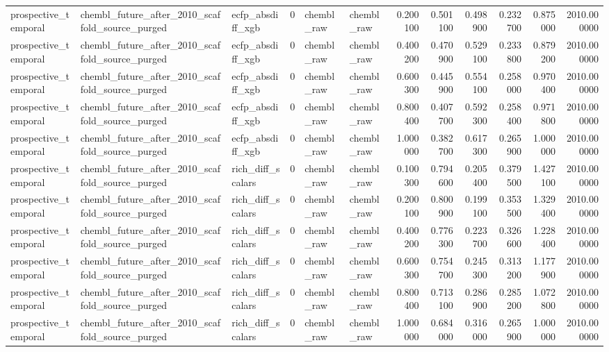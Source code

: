 \begin{longtable}{lllrllrrrrrr}
prospective\_temporal & chembl\_future\_after\_2010\_scaffold\_source\_purged & ecfp\_absdiff\_xgb & 0 & chembl\_raw & chembl\_raw & 0.200100 & 0.501100 & 0.498900 & 0.232700 & 0.875000 & 2010.000000 \\
prospective\_temporal & chembl\_future\_after\_2010\_scaffold\_source\_purged & ecfp\_absdiff\_xgb & 0 & chembl\_raw & chembl\_raw & 0.400200 & 0.470900 & 0.529100 & 0.233800 & 0.879200 & 2010.000000 \\
prospective\_temporal & chembl\_future\_after\_2010\_scaffold\_source\_purged & ecfp\_absdiff\_xgb & 0 & chembl\_raw & chembl\_raw & 0.600300 & 0.445900 & 0.554100 & 0.258000 & 0.970400 & 2010.000000 \\
prospective\_temporal & chembl\_future\_after\_2010\_scaffold\_source\_purged & ecfp\_absdiff\_xgb & 0 & chembl\_raw & chembl\_raw & 0.800400 & 0.407700 & 0.592300 & 0.258400 & 0.971800 & 2010.000000 \\
prospective\_temporal & chembl\_future\_after\_2010\_scaffold\_source\_purged & ecfp\_absdiff\_xgb & 0 & chembl\_raw & chembl\_raw & 1.000000 & 0.382700 & 0.617300 & 0.265900 & 1.000000 & 2010.000000 \\
prospective\_temporal & chembl\_future\_after\_2010\_scaffold\_source\_purged & rich\_diff\_scalars & 0 & chembl\_raw & chembl\_raw & 0.100300 & 0.794600 & 0.205400 & 0.379500 & 1.427100 & 2010.000000 \\
prospective\_temporal & chembl\_future\_after\_2010\_scaffold\_source\_purged & rich\_diff\_scalars & 0 & chembl\_raw & chembl\_raw & 0.200100 & 0.800900 & 0.199100 & 0.353500 & 1.329400 & 2010.000000 \\
prospective\_temporal & chembl\_future\_after\_2010\_scaffold\_source\_purged & rich\_diff\_scalars & 0 & chembl\_raw & chembl\_raw & 0.400200 & 0.776300 & 0.223700 & 0.326600 & 1.228400 & 2010.000000 \\
prospective\_temporal & chembl\_future\_after\_2010\_scaffold\_source\_purged & rich\_diff\_scalars & 0 & chembl\_raw & chembl\_raw & 0.600300 & 0.754700 & 0.245300 & 0.313200 & 1.177900 & 2010.000000 \\
prospective\_temporal & chembl\_future\_after\_2010\_scaffold\_source\_purged & rich\_diff\_scalars & 0 & chembl\_raw & chembl\_raw & 0.800400 & 0.713100 & 0.286900 & 0.285200 & 1.072800 & 2010.000000 \\
prospective\_temporal & chembl\_future\_after\_2010\_scaffold\_source\_purged & rich\_diff\_scalars & 0 & chembl\_raw & chembl\_raw & 1.000000 & 0.684000 & 0.316000 & 0.265900 & 1.000000 & 2010.000000 \\

\end{longtable}
